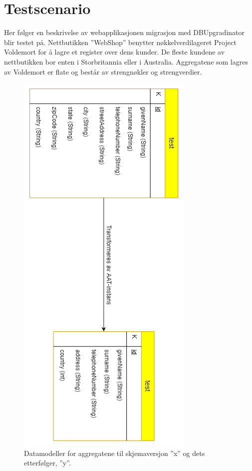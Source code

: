 \section{Testscenario} \label{k51}

Her følger en beskrivelse av webapplikasjonen migrasjon med DBUpgradinator blir testet på. Nettbutikken ''WebShop'' benytter nøkkelverdi\-lageret Project Voldemort for å lagre et register over dens kunder. De fleste kundene av nettbutikken bor enten i Storbritannia eller i Australia. Aggregatene som lagres av Voldemort er flate og består av strengnøkler og strengverdier.

\begin{figure}[hbtp]
    \centering
    \includegraphics[scale=0.9]{fig/WSS-AggregatModell.png}
    \caption{Datamodeller for aggregatene til skjemaversjon ''x'' og dets etterfølger, ''y''.}
    \label{fig11}
\end{figure}

